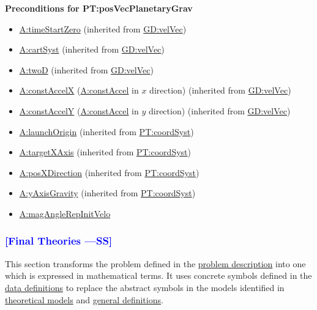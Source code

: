 \documentclass[12pt]{article}
\newcommand{\authornote}[3]{\textcolor{#1}{[#3 ---#2]}}
\newcommand{\authornote}[3]{}
\newcommand{\wss}[1]{\authornote{blue}{SS}{#1}}
\begin{document}
\noindent \textbf{Preconditions for PT:posVecPlanetaryGrav} 
\begin{itemize} 
\item \hyperref[timeStartZero]{A:timeStartZero} (inherited from
\hyperref[GD:velVec]{GD:velVec}) 
\item \hyperref[cartSyst]{A:cartSyst} (inherited from
\hyperref[GD:velVec]{GD:velVec}) 
\item \hyperref[twoD]{A:twoD} (inherited from \hyperref[GD:velVec]{GD:velVec}) 
\item \hyperref[constAccelX]{A:constAccelX} (\hyperref[constAccel]{A:constAccel}
in $x$ direction) (inherited from \hyperref[GD:velVec]{GD:velVec}) 
\item \hyperref[constAccelY]{A:constAccelY} (\hyperref[constAccel]{A:constAccel}
in $y$ direction) (inherited from \hyperref[GD:velVec]{GD:velVec}) 
\item \hyperref[launchOrigin]{A:launchOrigin} (inherited from
\hyperref[PT:coordSyst]{PT:coordSyst}) 
\item \hyperref[targetXAxis]{A:targetXAxis} (inherited from
\hyperref[PT:coordSyst]{PT:coordSyst}) 
\item \hyperref[posXDirection]{A:posXDirection} (inherited from
\hyperref[PT:coordSyst]{PT:coordSyst}) 
\item \hyperref[yAxisGravity]{A:yAxisGravity} (inherited from
\hyperref[PT:coordSyst]{PT:coordSyst}) 
\item \hyperref[magAngleRepInitVelo]{A:magAngleRepInitVelo} 
\end{itemize}

\subsubsection{\wss{Final Theories}} \label{Sec:IMs} This section transforms the
problem defined in the \hyperref[Sec:ProbDesc]{problem description} into one
which is expressed in mathematical terms. It uses concrete symbols defined in
the \hyperref[Sec:DDs]{data definitions} to replace the abstract symbols in the
models identified in \hyperref[Sec:TMs]{theoretical models} and
\hyperref[Sec:GDs]{general definitions}.
\end{document}
